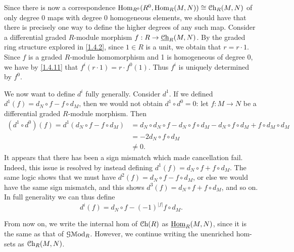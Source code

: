 \begin{construction}
	Since there is now a correspondence $\operatorname{Hom}_{R^0}(R^0, \operatorname{Hom}_R(M,N))\cong \mathcal{C}\mathrm{h}_R(M,N)$ of only degree 0 maps with degree 0 homogeneous elements, we should have that there is precisely one way to define the higher degrees of any such map. Consider a differential graded $R$-module morphism $f : R \to \underline{\mathcal{C}\mathrm{h}}_R(M,N)$. By the graded ring structure explored in \cref{1.4.2}, since $1\in R$ is a unit, we obtain that $r=r\cdot 1$. Since $f$ is a graded $R$-module homomorphism and 1 is homogeneous of degree 0, we have by \cref{1.4.11} that $f^i(r\cdot 1)=r\cdot f^0(1)$. Thus $f^i$ is uniquely determined by $f^0$.

	We now want to define $d^i$ fully generally. Consider $d^1$. If we defined $d^1(f) = d_N \circ f - f\circ d_M$, then we would not obtain $d^1 \circ d^0=0$: let $f : M \to N$ be a differential graded $R$-module morphism. Then
	\begin{align*}
		(d^1\circ d^0)(f) = d^1(d_N \circ f-f\circ d_M) &= d_N\circ d_N \circ f - d_N\circ f\circ d_M - d_N \circ f \circ d_M + f\circ  d_M \circ d_M\\
								&=-2d_N \circ f \circ d_M\\
								&\neq 0
	.\end{align*}
	It appears that there has been a sign mismatch which made cancellation fail. Indeed, this issue is resolved by instead defining $d^1(f) = d_N \circ f + f \circ d_M$. The same logic shows that we must have $d^2(f) = d_N \circ f - f \circ d_M$, or else we would have the same sign mismatch, and this shows $d^3(f) = d_N \circ f + f \circ d_M$, and so on. In full generality we can thus define
	\[
		d^i(f) = d_N \circ f - (-1)^{\left| f \right| } f\circ d_M
	.\]
\end{construction}

\begin{notation}\label{2.1.9}
	From now on, we write the internal hom of $\mathcal{C}\mathrm{h}(R) $ as $\underline{\operatorname{Hom}}_R(M,N)$, since it is the same as that of $\mathcal{G} \mathcal{M}\mathrm{od} _R$. However, we continue writing the unenriched hom-sets as $\mathcal{C}\mathrm{h}_R(M,N)$.
\end{notation}




